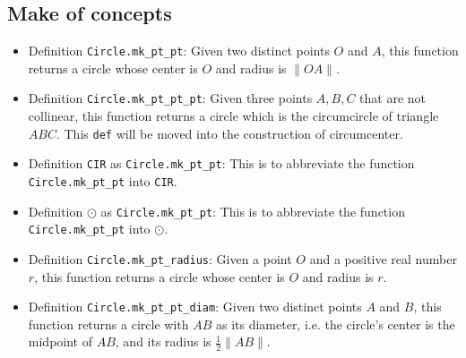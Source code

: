 \documentclass[12pt]{amsart}
\begin{document}
\subsection{Make of concepts}
\begin{itemize}
    \item Definition \verb|Circle.mk_pt_pt|: Given two distinct points $O$ and $A$, this function returns a circle whose center is $O$ and radius is $\|OA\|$.
    \item Definition \verb|Circle.mk_pt_pt_pt|: Given three points $A,B,C$ that are not collinear, this function returns a circle which is the circumcircle of triangle $ABC$. {\color{red} This \verb|def| will be moved into the construction of circumcenter.}
    \item Definition \verb|CIR| as \verb|Circle.mk_pt_pt|: This is to abbreviate the function \verb|Circle.mk_pt_pt| into \verb|CIR|.
    \item Definition $\odot$ as \verb|Circle.mk_pt_pt|: This is to abbreviate the function \verb|Circle.mk_pt_pt| into $\odot$.
    \item Definition \verb|Circle.mk_pt_radius|: Given a point $O$ and a positive real number $r$, this function returns a circle whose center is $O$ and radius is $r$.
    \item Definition \verb|Circle.mk_pt_pt_diam|: Given two distinct points $A$ and $B$, this function returns a circle with $AB$ as its diameter, i.e. the circle's center is the midpoint of $AB$, and its radius is $\frac{1}{2}\|AB\|$.
\end{itemize}
\end{document}
